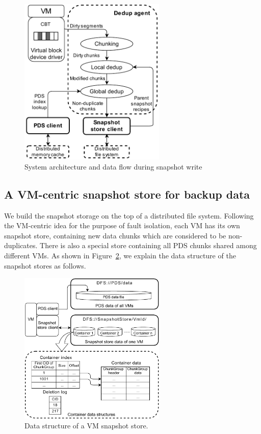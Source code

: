 \begin{figure}[htbp]
    \centering
    \includegraphics[width=2.75in]{images/socc_arch_cluster}
    \caption{System architecture and data flow during snapshot write}
    \label{fig:arch_vm}
\end{figure}

\subsection{A VM-centric snapshot store for backup data}
\label{sect:store}
We build the snapshot storage on the top of a distributed file system.
Following the VM-centric idea for the purpose of fault isolation,
each VM has its own snapshot store, containing new data chunks which are considered
to be non-duplicates.
There is also a special store containing all PDS chunks shared among different VMs.
As shown in Figure~\ref{fig:as_arch}, we explain the data structure of the snapshot stores as follows.
\begin{figure}[htbp]
  \centering
  \includegraphics[width=2.75in]{images/sstore_arch}
  \caption{Data structure of a VM snapshot store.}
  \label{fig:as_arch}
\end{figure}

